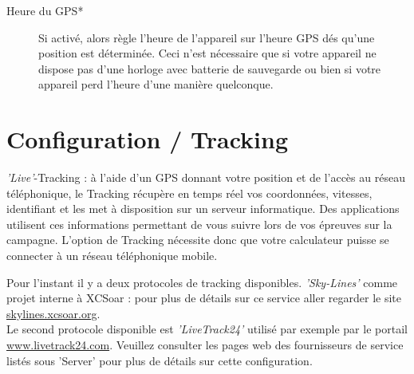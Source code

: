 \begin{description}
\item[Heure du GPS*] Si activé, alors règle l'heure de l'appareil sur l'heure GPS dés qu'une position est déterminée. Ceci n'est nécessaire que si votre appareil ne dispose pas d'une horloge avec batterie de sauvegarde ou bien si votre appareil perd l'heure d'une manière quelconque.
\end{description}


\section{Configuration / Tracking}

{\it 'Live'}-Tracking : à l'aide d'un GPS donnant votre position et de l'accès au réseau téléphonique, le Tracking récupère en temps réel vos coordonnées, vitesses, identifiant et les met à disposition sur un serveur informatique. Des applications utilisent ces informations permettant de vous suivre lors de vos épreuves sur la campagne. L'option de Tracking nécessite donc que votre calculateur puisse se connecter à un réseau téléphonique mobile. 

Pour l'instant il y a deux protocoles de tracking disponibles. {\it 'Sky-Lines'} comme projet interne à XCSoar : pour plus de détails sur ce service aller regarder le site {\href{http://skylines.xcsoar.org}{skylines.xcsoar.org}}.\\
Le second protocole disponible est {\it 'LiveTrack24'} utilisé par exemple par le portail {\href{http://www.livetrack24.com}{www.livetrack24.com}}. Veuillez consulter les pages web des fournisseurs de service listés sous 'Server' pour plus de détails sur cette configuration.

